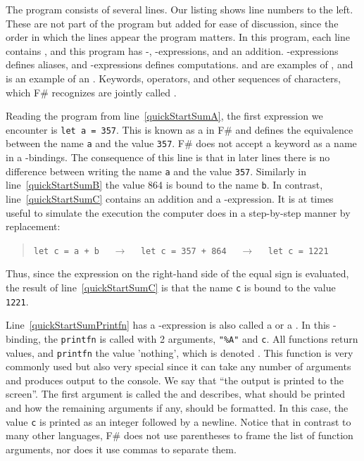 \documentclass[springer.tex]{subfiles}
\begin{document}
The program consists of several lines. Our listing shows line numbers to the left. These are not part of the program but added for ease of discussion, since the order in which the lines appear the program matters. In this program, each line contains , and this program has -, -expressions, and an addition. -expressions defines aliases, and -expressions defines computations.  and  are examples of , and \lexeme{+} is an example of an . Keywords, operators, and other sequences of characters, which F\# recognizes are jointly called .

Reading the program from line~\ref{quickStartSumA}, the first expression we encounter is \lstinline|let a = 357|. This is known as a  in F\# and defines the equivalence between the name \lstinline{a} and the value \lstinline{357}. F\# does not accept a keyword as a name in a -bindings. The consequence of this line is that in later lines there is no difference between writing the name \lstinline{a} and the value \lstinline{357}. Similarly in line~\ref{quickStartSumB} the value 864 is bound to the name \lstinline|b|. In contrast, line~\ref{quickStartSumC} contains an addition and a -expression. It is at times useful to simulate the execution the computer does in a step-by-step manner by replacement:
\begin{quote}
  \lstinline{let c = a + b} $\quad\rightarrow\quad$  \lstinline{let c = 357 + 864}  $\quad\rightarrow\quad$  \lstinline{let c = 1221}
\end{quote}
Thus, since the expression on the right-hand side of the equal sign is evaluated, the result of line~\ref{quickStartSumC} is that the name \lstinline{c} is bound to the value \lstinline{1221}.

Line~\ref{quickStartSumPrintfn} has a -expression is also called a  or a . In this -binding, the    \lstinline{printfn} is called with 2 arguments, \lstinline{"%A"}%
  and \lstinline{c}. All functions return values, and \lstinline|printfn| the value 'nothing', which is denoted \idx[{()}@\lstinline{()}]{\lexeme{()}}. This function is very commonly used but also very special since it can take any number of arguments and produces output to the console. We say that ``the output is printed to the screen''. The first argument is called the  and describes, what should be printed and how the remaining arguments if any, should be formatted. In this case, the value \lstinline{c} is printed as an integer followed by a newline. Notice that in contrast to many other languages, F\# does not use parentheses to frame the list of function arguments, nor does it use commas to separate them.
\end{document}
